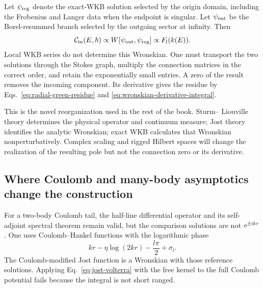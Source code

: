 Let $\psi_{\mathrm{reg}}$ denote the exact-WKB solution selected by the origin
domain, including the Frobenius and Langer data when the endpoint is singular.
Let $\psi_{\mathrm{out}}$ be the Borel-resummed branch selected by the outgoing
sector at infinity.  Then
\begin{equation}
  \mathcal{C}_{\mathrm{in}}(E,\hbar)
  \propto
  W[\psi_{\mathrm{out}},\psi_{\mathrm{reg}}]
  \propto F_l(k(E)).
  \label{eq:wkb-jost-wronskian}
\end{equation}
Local WKB series do not determine this Wronskian.  One must transport the two
solutions through the Stokes graph, multiply the connection matrices in the
correct order, and retain the exponentially small entries.  A zero of the
result removes the incoming component.  Its derivative gives the residue by
Eqs.~\eqref{eq:radial-green-residue} and
\eqref{eq:wronskian-derivative-integral}.

This is the novel reorganization used in the rest of the book.  Sturm--
Liouville theory determines the physical operator and continuum measure;
Jost theory identifies the analytic Wronskian; exact WKB calculates that
Wronskian nonperturbatively.  Complex scaling and rigged Hilbert spaces will
change the realization of the resulting pole but not the connection zero or
its derivative.

\subsection{Where Coulomb and many-body asymptotics change the construction}
\label{subsec:sl-jost-long-range-limit}

For a two-body Coulomb tail, the half-line differential operator and its
self-adjoint spectral theorem remain valid, but the comparison solutions are
not $\mathrm{e}^{\pm\mathrm{i} kr}$.  One uses Coulomb--Hankel functions with the
logarithmic phase
\begin{equation}
  kr-\eta\log(2kr)-\frac{l\pi}{2}+\sigma_l.
  \label{eq:coulomb-jost-phase}
\end{equation}
The Coulomb-modified Jost function is a Wronskian with those reference
solutions.  Applying Eq.~\eqref{eq:jost-volterra} with the free kernel to the
full Coulomb potential fails because the integral is not short ranged.

